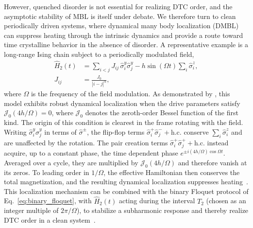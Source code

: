 \documentclass[%
reprint,
superscriptaddress,
amsmath,amssymb,
aps,
prb,
showkeys,%
floatfix,
]{revtex4-2}
\let\cite\citep   %
\begin{document}
	However, quenched disorder is not essential for realizing DTC order, and the asymptotic stability of MBL is itself under debate. We therefore turn to clean periodically driven systems, where dynamical many body localization (DMBL) can suppress heating through the intrinsic dynamics and provide a route toward time crystalline behavior in the absence of disorder. A representative example is a long-range Ising chain subject to a periodically modulated field,
	\begin{equation}
		\begin{aligned}
			\hat{H}_2(t)&=\sum_{i<j}J_{ij}\,\hat{\sigma}_i^y\hat{\sigma}_j^y
			-h\sin(\Omega t)\sum_i\hat{\sigma}_i^z,\\
			J_{ij}&=\frac{J_0}{|i-j|^\alpha},
		\end{aligned}
		\label{eq:dmbl}
	\end{equation}
	where $\Omega$ is the frequency of the field modulation. As demonstrated by \citet{rahaman2024prb,rahaman2024njp}, this model exhibits robust dynamical localization when the drive parameters satisfy $\mathcal{J}_0\left(4h/\Omega\right)=0$, where $\mathcal{J}_0$ denotes the zeroth-order Bessel function of the first kind. The origin of this condition is clearest in the frame rotating with the field. Writing $\hat{\sigma}_i^y\hat{\sigma}_j^y$ in terms of $\hat{\sigma}^\pm$, the flip-flop terms $\hat{\sigma}_i^+\hat{\sigma}_j^-+\mathrm{h.c.}$ conserve $\sum_i\hat{\sigma}_i^z$ and are unaffected by the rotation. The pair creation terms $\hat{\sigma}_i^+\hat{\sigma}_j^++\mathrm{h.c.}$ instead acquire, up to a constant phase, the time dependent phase $e^{\pm i(4h/\Omega)\cos\Omega t}$. Averaged over a cycle, they are multiplied by $\mathcal{J}_0(4h/\Omega)$ and therefore vanish at its zeros. To leading order in $1/\Omega$, the effective Hamiltonian then conserves the total magnetization, and the resulting dynamical localization suppresses heating~\cite{rahaman2024prb}. This localization mechanism can be combined with the binary Floquet protocol of Eq.~\eqref{eq:binary_floquet}, with $\hat{H}_2(t)$ acting during the interval $T_2$ (chosen as an integer multiple of $2\pi/\Omega$), to stabilize a subharmonic response and thereby realize DTC order in a clean system~\cite{rahaman2024njp}.
	
\end{document}
